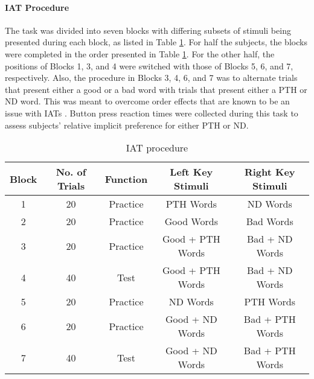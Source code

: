 \paragraph{IAT Procedure}
\label{para:IATprocedure}
The task was divided into seven blocks with differing subsets of stimuli being presented during each block, as listed in Table \ref{table:IATprocedure}. For half the subjects, the blocks were completed in the order presented in Table \ref{table:IATprocedure}. For the other half, the positions of Blocks 1, 3, and 4 were switched with those of Blocks 5, 6, and 7, respectively. Also, the procedure in Blocks 3, 4, 6, and 7 was to alternate trials that present either a good or a bad word with trials that present either a PTH or ND word. This was meant to overcome order effects that are known to be an issue with IATs \citep{greenwald2003understanding}. Button press reaction times were collected during this task to assess subjects’ relative implicit preference for either PTH or ND.

\begin{table}
\centering
 \begin{tabular}{|c|c|c|c|c|} 
 \hline
 Block & No. of Trials & Function & Left Key Stimuli & Right Key Stimuli \\ [0.5ex] 
 \hline\hline
 1 & 20 & Practice & PTH Words & ND Words\\ 
 \hline
 2 & 20 & Practice & Good Words & Bad Words\\
 \hline
 3 & 20 & Practice & Good + PTH Words & Bad + ND Words\\
 \hline
 4 & 40 & Test & Good + PTH Words & Bad + ND Words\\
 \hline
 5 & 20 & Practice & ND Words & PTH Words\\
 \hline
 6 & 20 & Practice & Good + ND Words & Bad + PTH Words\\
 \hline
 7 & 40 & Test & Good + ND Words & Bad + PTH Words\\
 \hline
\end{tabular}
\caption{IAT procedure}
\label{table:IATprocedure}
\end{table}

